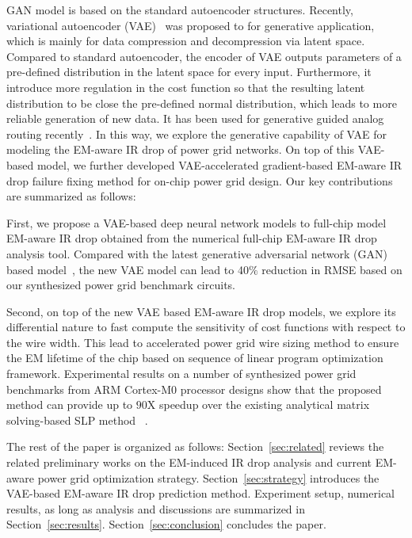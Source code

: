    
GAN model is based on the standard autoencoder structures.
Recently, variational autoencoder (VAE)~\cite{Diederik:arxiv'22} was proposed to for generative application, which is mainly for data compression and decompression via latent space. Compared to standard autoencoder, the encoder of VAE outputs parameters of a pre-defined distribution in the latent space for every input. Furthermore, it introduce more regulation in the cost function so that the resulting latent distribution to be close the pre-defined normal distribution, which leads to more reliable generation of new data. It has been used for generative guided analog routing recently~\cite{Zhu:ICCAD'19}.
In this way, we explore the generative capability of VAE for modeling the EM-aware IR drop of power grid networks. On top of this VAE-based model, we further developed VAE-accelerated gradient-based EM-aware IR drop failure fixing method for on-chip power grid design. Our key contributions are summarized as follows:

\begin{itemlist}
\item First, we propose a VAE-based deep neural network models to full-chip model EM-aware IR drop obtained from the numerical full-chip EM-aware IR drop analysis tool.  Compared with the latest generative adversarial network (GAN) based model~\cite{ZhouJin:ICCAD'20}, the new VAE model can lead to 40$\%$ reduction in RMSE based on our synthesized power grid benchmark circuits.

\item Second, on top of the new VAE based EM-aware IR drop models, we explore its differential nature to fast compute the sensitivity of cost functions with respect to the wire width. This lead to accelerated power grid wire sizing method to ensure the EM lifetime of the chip based on sequence of linear program optimization framework. Experimental results on a number of synthesized power grid benchmarks from ARM Cortex-M0 processor designs show that the proposed method can provide up to $90$X speedup over the existing analytical matrix solving-based SLP method ~\cite{Sukharev:2019pg}.
 
\end{itemlist}

The rest of the paper is organized as follows: Section~\ref{sec:related} reviews the related preliminary works on the EM-induced IR drop analysis and current EM-aware power grid optimization strategy. Section~\ref{sec:strategy} introduces the VAE-based EM-aware IR drop prediction method. Experiment setup, numerical results, as long as analysis and discussions are summarized in Section~\ref{sec:results}.  Section~\ref{sec:conclusion} concludes the paper.